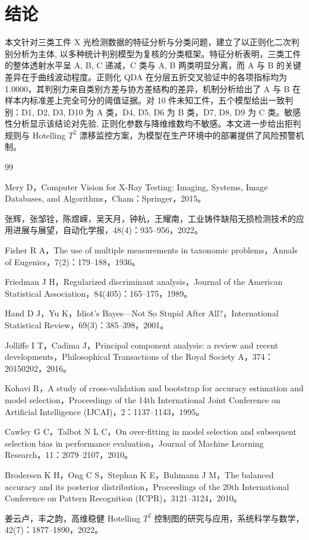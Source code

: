 \documentclass[12pt,a4paper]{article}
\begin{document}
\section{结论}

本文针对三类工件 X 光检测数据的特征分析与分类问题，建立了以正则化二次判别分析为主体, 以多种统计判别模型为复核的分类框架。特征分析表明，三类工件的整体透射水平呈 A, B, C 递减，C 类与 A, B 两类明显分离，而 A 与 B 的关键差异在于曲线波动程度。正则化 QDA 在分层五折交叉验证中的各项指标均为 1.0000，其判别力来自类别方差与协方差结构的差异，机制分析给出了 A 与 B 在样本内标准差上完全可分的阈值证据。对 10 件未知工件，五个模型给出一致判别：D1, D2, D3, D10 为 A 类，D4, D5, D6 为 B 类，D7, D8, D9 为 C 类。敏感性分析显示该结论对先验, 正则化参数与降维维数均不敏感。本文进一步给出拒判规则与 Hotelling $T^2$ 漂移监控方案，为模型在生产环境中的部署提供了风险预警机制。

\clearpage
\begin{thebibliography}{99}
 Mery D，Computer Vision for X-Ray Testing: Imaging, Systems, Image Databases, and Algorithms，Cham：Springer，2015。

 张辉，张邹铨，陈煜嵘，吴天月，钟杭，王耀南，工业铸件缺陷无损检测技术的应用进展与展望，自动化学报，48(4)：935--956，2022。

 Fisher R A，The use of multiple measurements in taxonomic problems，Annals of Eugenics，7(2)：179--188，1936。

 Friedman J H，Regularized discriminant analysis，Journal of the American Statistical Association，84(405)：165--175，1989。

 Hand D J，Yu K，Idiot's Bayes—Not So Stupid After All?，International Statistical Review，69(3)：385--398，2001。

 Jolliffe I T，Cadima J，Principal component analysis: a review and recent developments，Philosophical Transactions of the Royal Society A，374：20150202，2016。

 Kohavi R，A study of cross-validation and bootstrap for accuracy estimation and model selection，Proceedings of the 14th International Joint Conference on Artificial Intelligence (IJCAI)，2：1137--1143，1995。

 Cawley G C，Talbot N L C，On over-fitting in model selection and subsequent selection bias in performance evaluation，Journal of Machine Learning Research，11：2079--2107，2010。

 Brodersen K H，Ong C S，Stephan K E，Buhmann J M，The balanced accuracy and its posterior distribution，Proceedings of the 20th International Conference on Pattern Recognition (ICPR)，3121--3124，2010。

 姜云卢，丰之韵，高维稳健 Hotelling $T^2$ 控制图的研究与应用，系统科学与数学，42(7)：1877--1890，2022。
\end{thebibliography}
\end{document}
